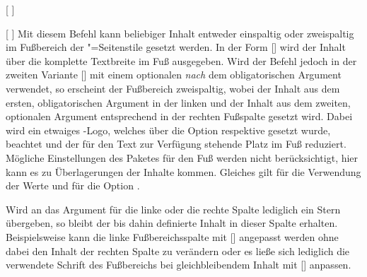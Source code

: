 \begin{Declaration*}{}
\begin{Declaration*}{}
\begin{Declaration*}{}
\begin{Declaration}{%
  [%
  ]%
}
\begin{Declaration}[v2.04]{%
  [%
  ]%
}
\printdeclarationlist%
%
%
Mit diesem Befehl kann beliebiger Inhalt entweder einspaltig oder zweispaltig 
im Fußbereich der "=Seitenstile gesetzt werden. In der 
Form [] wird der Inhalt über die komplette 
Textbreite im Fuß ausgegeben. Wird der Befehl jedoch in der zweiten Variante 
[] mit 
einem optionalen \emph{nach} dem obligatorischen Argument verwendet, so 
erscheint der Fußbereich zweispaltig, wobei der Inhalt aus dem ersten, 
obligatorischen Argument in der linken und der Inhalt aus dem zweiten, 
optionalen Argument entsprechend in der rechten Fußspalte gesetzt wird. Dabei 
wird ein etwaiges \DDC-Logo, welches über die Option  respektive
 gesetzt wurde, beachtet und der für den Text zur Verfügung 
stehende Platz im Fuß reduziert. Mögliche Einstellungen des Paketes  
 für den Fuß werden nicht berücksichtigt, hier kann 
es zu Überlagerungen der Inhalte kommen. Gleiches gilt für die Verwendung der 
Werte  und  für die Option .

Wird an das Argument für die linke oder die rechte Spalte lediglich ein Stern 
\PValue{*} übergeben, so bleibt der bis dahin definierte Inhalt in dieser 
Spalte erhalten. Beispielsweise kann die linke Fußbereichsspalte mit 
[\POParameter{*}] angepasst werden ohne 
dabei den Inhalt der rechten Spalte zu verändern oder es ließe sich lediglich 
die verwendete Schrift des Fußbereichs bei gleichbleibendem Inhalt mit 
[\PParameter{*}\POParameter{*}]%
anpassen.


\end{Declaration}
\end{Declaration}
\end{Declaration*}
\end{Declaration*}
\end{Declaration*}
